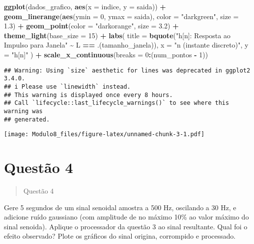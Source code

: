 \documentclass[
]{article}
\newenvironment{Shaded}{\begin{snugshade}}{\end{snugshade}}
\newcommand{\AttributeTok}[1]{\textcolor[rgb]{0.13,0.29,0.53}{#1}}
\newcommand{\DecValTok}[1]{\textcolor[rgb]{0.00,0.00,0.81}{#1}}
\newcommand{\FloatTok}[1]{\textcolor[rgb]{0.00,0.00,0.81}{#1}}
\newcommand{\FunctionTok}[1]{\textcolor[rgb]{0.13,0.29,0.53}{\textbf{#1}}}
\newcommand{\NormalTok}[1]{#1}
\newcommand{\SpecialCharTok}[1]{\textcolor[rgb]{0.81,0.36,0.00}{\textbf{#1}}}
\newcommand{\StringTok}[1]{\textcolor[rgb]{0.31,0.60,0.02}{#1}}
\begin{document}
\begin{Shaded}
\begin{Highlighting}[]
\FunctionTok{ggplot}\NormalTok{(dados\_grafico, }\FunctionTok{aes}\NormalTok{(}\AttributeTok{x =}\NormalTok{ indice, }\AttributeTok{y =}\NormalTok{ saida)) }\SpecialCharTok{+}
  \FunctionTok{geom\_linerange}\NormalTok{(}\FunctionTok{aes}\NormalTok{(}\AttributeTok{ymin =} \DecValTok{0}\NormalTok{, }\AttributeTok{ymax =}\NormalTok{ saida), }\AttributeTok{color =} \StringTok{"darkgreen"}\NormalTok{, }\AttributeTok{size =} \FloatTok{1.3}\NormalTok{) }\SpecialCharTok{+}
  \FunctionTok{geom\_point}\NormalTok{(}\AttributeTok{color =} \StringTok{"darkorange"}\NormalTok{, }\AttributeTok{size =} \FloatTok{3.2}\NormalTok{) }\SpecialCharTok{+}
  \FunctionTok{theme\_light}\NormalTok{(}\AttributeTok{base\_size =} \DecValTok{15}\NormalTok{) }\SpecialCharTok{+}
  \FunctionTok{labs}\NormalTok{(}
    \AttributeTok{title =} \FunctionTok{bquote}\NormalTok{(}\StringTok{"h[n]: Resposta ao Impulso para Janela"} \SpecialCharTok{\textasciitilde{}}\NormalTok{ L }\SpecialCharTok{==}\NormalTok{ .(tamanho\_janela)),}
    \AttributeTok{x =} \StringTok{"n (instante discreto)"}\NormalTok{,}
    \AttributeTok{y =} \StringTok{"h[n]"}
\NormalTok{  ) }\SpecialCharTok{+}
  \FunctionTok{scale\_x\_continuous}\NormalTok{(}\AttributeTok{breaks =} \DecValTok{0}\SpecialCharTok{:}\NormalTok{(num\_pontos }\SpecialCharTok{{-}} \DecValTok{1}\NormalTok{))}
\end{Highlighting}
\end{Shaded}

\begin{verbatim}
## Warning: Using `size` aesthetic for lines was deprecated in ggplot2 3.4.0.
## i Please use `linewidth` instead.
## This warning is displayed once every 8 hours.
## Call `lifecycle::last_lifecycle_warnings()` to see where this warning was
## generated.
\end{verbatim}

\texttt{[image: Modulo8\_files/figure-latex/unnamed-chunk-3-1.pdf]}

\newpage
\section*{Questão 4}

\begin{quote}
Questão 4
\end{quote}

Gere 5 segundos de um sinal senoidal amostra a 500 Hz, oscilando a 30
Hz, e adicione ruído gaussiano (com amplitude de no máximo 10\% ao valor
máximo do sinal senoida). Aplique o processador da questão 3 ao sinal
resultante. Qual foi o efeito observado? Plote os gráficos do sinal
origina, corrompido e processado.
\end{document}
